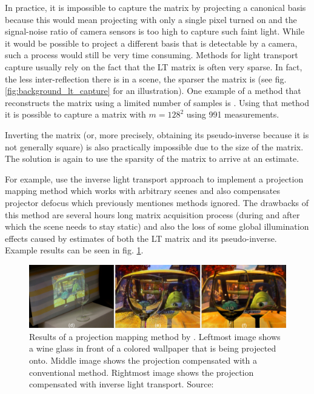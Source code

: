 In practice, it is impossible to capture the matrix by projecting a canonical basis because this would mean projecting with only a single pixel turned on and the signal-noise ratio of camera sensors is too high to capture such faint light. While it would be possible to project a different basis that is detectable by a camera, such a process would still be very time consuming. Methods for light transport capture usually rely on the fact that the LT matrix is often very sparse. In fact, the less inter-reflection there is in a scene, the sparser the matrix is (see fig. \ref{fig:background_lt_capture} for an illustration). One example of a method that reconstructs the matrix using a limited number of samples is \citet{Peers2009}. Using that method it is possible to capture a matrix with \(m = 128^2\) using 991 measurements.

Inverting the matrix (or, more precisely, obtaining its pseudo-inverse because it is not generally square) is also practically impossible due to the size of the matrix. The solution is again to use the sparsity of the matrix to arrive at an estimate.

For example, \citet{Wetzstein2007} use the inverse light transport approach to implement a projection mapping method which works with arbitrary scenes and also compensates projector defocus which previously mentiones methods ignored. The drawbacks of this method are several hours long matrix acquisition process (during and after which the scene needs to stay static) and also the loss of some global illumination effects caused by estimates of both the LT matrix and its pseudo-inverse. Example results can be seen in fig. \ref{fig:background_wetzstein_result}.

\begin{figure}[ht]
    \centering
    \includegraphics[width=\textwidth]{images/02-wetzstein_result_crop_compressed.jpg}
    \caption{Results of a projection mapping method by \citet{Wetzstein2007}. Leftmost image shows a wine glass in front of a colored wallpaper that is being projected onto. Middle image shows the projection compensated with a conventional method. Rightmost image shows the projection compensated with inverse light transport. Source: \citet{Wetzstein2007}}
    \label{fig:background_wetzstein_result}
\end{figure}

